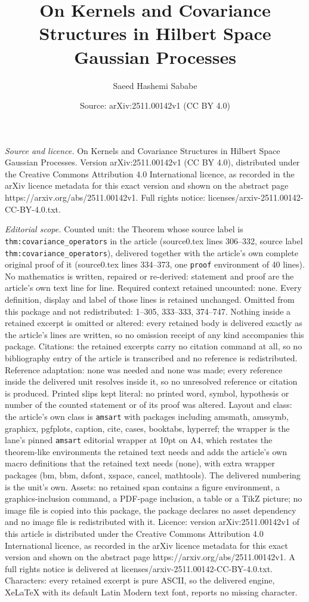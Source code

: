 \documentclass[10pt,a4paper]{amsart}
\title[On Kernels and Covariance Structures in Hilbert Space Gaussi]{On Kernels and Covariance Structures in Hilbert Space Gaussian Processes}
\author{Saeed Hashemi Sababe}
\date{Source: arXiv:2511.00142v1 (CC BY 4.0)}
\begin{document}
\maketitle

\noindent\emph{Source and licence.} On Kernels and Covariance Structures in Hilbert Space Gaussian Processes. Version arXiv:2511.00142v1 (CC BY 4.0), distributed under the Creative Commons Attribution 4.0 International licence, as recorded in the arXiv licence metadata for this exact version and shown on the abstract page https://arxiv.org/abs/2511.00142v1. Full rights notice: licenses/arxiv-2511.00142-CC-BY-4.0.txt.\par\smallskip

\noindent\textit{Editorial scope.} Counted unit: the Theorem whose source label is \texttt{thm:covariance\_operators} in the article (source0.tex lines 306--332, source label \texttt{thm:covariance\_operators}), delivered together with the article's own complete original proof of it (source0.tex lines 334--373, one \texttt{proof} environment of 40 lines). No mathematics is written, repaired or re-derived: statement and proof are the article's own text line for line. Required context retained uncounted: none. Every definition, display and label of those lines is retained unchanged. Omitted from this package and not redistributed: 1--305, 333--333, 374--747. Nothing inside a retained excerpt is omitted or altered: every retained body is delivered exactly as the article's lines are written, so no omission receipt of any kind accompanies this package. Citations: the retained excerpts carry no citation command at all, so no bibliography entry of the article is transcribed and no reference is redistributed. Reference adaptation: none was needed and none was made; every reference inside the delivered unit resolves inside it, so no unresolved reference or citation is produced. Printed slips kept literal: no printed word, symbol, hypothesis or number of the counted statement or of its proof was altered. Layout and class: the article's own class is \texttt{amsart} with packages including amsmath, amssymb, graphicx, pgfplots, caption, cite, cases, booktabs, hyperref; the wrapper is the lane's pinned \texttt{amsart} editorial wrapper at 10pt on A4, which restates the theorem-like environments the retained text needs and adds the article's own macro definitions that the retained text needs (none), with extra wrapper packages (bm, bbm, dsfont, xspace, cancel, mathtools). The delivered numbering is the unit's own. Assets: no retained span contains a figure environment, a graphics-inclusion command, a PDF-page inclusion, a table or a TikZ picture; no image file is copied into this package, the package declares no asset dependency and no image file is redistributed with it. Licence: version arXiv:2511.00142v1 of this article is distributed under the Creative Commons Attribution 4.0 International licence, as recorded in the arXiv licence metadata for this exact version and shown on the abstract page https://arxiv.org/abs/2511.00142v1. A full rights notice is delivered at licenses/arxiv-2511.00142-CC-BY-4.0.txt. Characters: every retained excerpt is pure ASCII, so the delivered engine, XeLaTeX with its default Latin Modern text font, reports no missing character.
\end{document}
